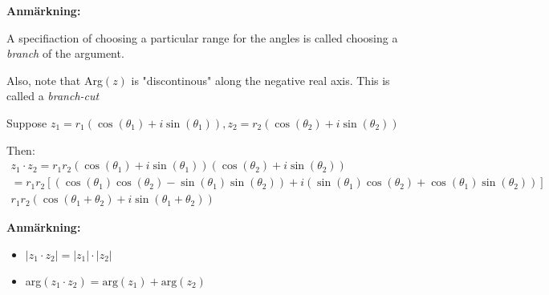\noindent\textbf{Anmärkning:}\par
\noindent A specifiaction of choosing a particular range for the angles is called choosing a \textit{branch} of the argument.\par
\noindent Also, note that Arg$(z)$ is "discontinous" along the negative real axis. This is called a \textit{branch-cut} 
\par\bigskip
\noindent Suppose $z_1 = r_1(\cos(\theta_1)+i\sin(\theta_1)), z_2 = r_2(\cos(\theta_2)+i\sin(\theta_2))$\par
\noindent Then:
\begin{equation*}
  \begin{gathered}
    z_1\cdot z_2 = r_1r_2(\cos(\theta_1)+i\sin(\theta_1))(\cos(\theta_2)+i\sin(\theta_2))\\
    =r_1r_2[(\cos(\theta_1)\cos(\theta_2)-\sin(\theta_1)\sin(\theta_2))+i(\sin(\theta_1)\cos(\theta_2)+\cos(\theta_1)\sin(\theta_2))]\\
    r_1r_2(\cos(\theta_1+\theta_2)+i\sin(\theta_1+\theta_2))
  \end{gathered}
\end{equation*}
\par\bigskip
\noindent\textbf{Anmärkning:}\par
\begin{itemize}
  \item $\left|z_1\cdot z_2\right| = \left|z_1\right|\cdot\left|z_2\right|$
  \item arg$(z_1\cdot z_2) = \text{arg}(z_1)+\text{arg}(z_2)$
\end{itemize}
\par\bigskip
